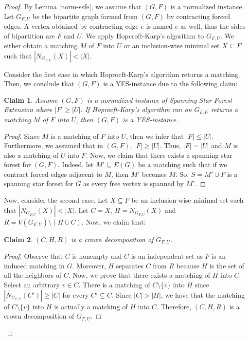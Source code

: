 \documentclass[en]{pracamgr}
\newtheorem{claim}{Claim}
\theoremstyle{definition}
\newcommand{\ssfep}{{\sc Spanning Star Forest Extension}}
\begin{document}
\begin{proof}
	By Lemma \ref{norm-ssfe}, we assume that $(G,F)$ is a normalized instance. Let $G_{F,U}$ be the bipartite graph formed from $(G,F)$ by contracting forced edges. A vertex obtained by contracting edge $e$ is named $e$ as well, thus the sides of bipartition are $F$ and $U$. We apply Hopcroft-Karp's algorithm to $G_{F,U}$. We either obtain a matching $M$ of $F$ into $U$ or an inclusion-wise minimal set $X \subseteq F$ such that $|N_{G_{F,U}}(X)| < |X|$.

	Consider the first case in which Hoprocft-Karp's algorithm returns a matching. Then, we conclude that $(G,F)$ is a YES-instance due to the following claim:
	\begin{claim}
		Assume $(G,F)$ is a normalized instance of \ssfep{} where $|F| \geq |U|$. If Hoprocft-Karp's algorithm ran on $G_{F,U}$ returns a matching $M$ of $F$ into $U$, then $(G,F)$ is a YES-instance.
	\end{claim}

	\begin{proof}
		Since $M$ is a matching of $F$ into $U$, then we infer that $|F| \leq |U|$. Furthermore, we assumed that in $(G,F)$, $|F| \geq |U|$. Thus, $|F|=|U|$ and $M$ is also a matching of $U$ into $F$. Now, we claim that there exists a spanning star forest for $(G,F)$. Indeed, let $M' \subseteq E(G)$ be a matching such that if we contract forced edges adjacent to $M$, then $M'$ becomes $M$. So, $S = M' \cup F$ is a spanning star forest for $G$ as every free vertex is spanned by $M'$.
	\end{proof}

	Now, consider the second case. Let $X \subseteq F$ be an inclusion-wise minimal set such that $|N_{G_{F,U}}(X)| < |X|$. Let $C=X$, $H=N_{G_{F,U}}(X)$ and $R= V(G_{F,U}) \setminus (H \cup C)$. Now, we claim that:
	\begin{claim}
		$(C,H,R)$ is a crown decomposition of $G_{F,U}$.
	\end{claim}
	\begin{proof}
		Observe that $C$ is nonempty and $C$ is an independent set as $F$ is an induced matching in $G$. Moreover, $H$ separates $C$ from $R$ because $H$ is the set of all the neighbors of $C$. Now, we prove that there exists a matching of $H$ into $C$. Select an arbitrary $v \in C$. There is a matching of $C \setminus \{v\}$ into $H$ since $|N_{G_{F,U}}(C')| \geq |C|$ for every $C' \subsetneq C$. Since $|C| > |H|$, we have that the matching of $C \setminus \{v\}$ into $H$ is actually a matching of $H$ into $C$. Therefore, $(C,H,R)$ is a crown decomposition of $G_{F,U}$.
	\end{proof}


\end{proof}
\end{document}
